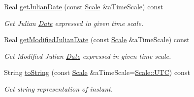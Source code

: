 \begin{DoxyCompactItemize}
Real \hyperlink{classlibrary_1_1physics_1_1time_1_1_instant_a592844ceab80e29ab65766aedc194acb}{get\+Julian\+Date} (const \hyperlink{namespacelibrary_1_1physics_1_1time_a09d2bc9fbc7b0b5f92e1419bd655e6bb}{Scale} \&a\+Time\+Scale) const
\begin{DoxyCompactList}\small\item\em Get Julian \hyperlink{classlibrary_1_1physics_1_1time_1_1_date}{Date} expressed in given time scale. \end{DoxyCompactList}\item 
Real \hyperlink{classlibrary_1_1physics_1_1time_1_1_instant_a01a167d6aee17d47ff200b2472199382}{get\+Modified\+Julian\+Date} (const \hyperlink{namespacelibrary_1_1physics_1_1time_a09d2bc9fbc7b0b5f92e1419bd655e6bb}{Scale} \&a\+Time\+Scale) const
\begin{DoxyCompactList}\small\item\em Get Modified Julian \hyperlink{classlibrary_1_1physics_1_1time_1_1_date}{Date} expressed in given time scale. \end{DoxyCompactList}\item 
String \hyperlink{classlibrary_1_1physics_1_1time_1_1_instant_aa3e7ee2c6704053afbf7ed142bb40c4e}{to\+String} (const \hyperlink{namespacelibrary_1_1physics_1_1time_a09d2bc9fbc7b0b5f92e1419bd655e6bb}{Scale} \&a\+Time\+Scale=\hyperlink{namespacelibrary_1_1physics_1_1time_a09d2bc9fbc7b0b5f92e1419bd655e6bba9234324ddf6b4176b57d803a925b7961}{Scale\+::\+U\+TC}) const
\begin{DoxyCompactList}\small\item\em Get string representation of instant. \end{DoxyCompactList}\end{DoxyCompactItemize}
